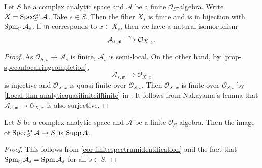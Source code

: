 \begin{corollary}\label{cor-finitespectrumidentification}
    Let $S$ be a complex analytic space and $\mathcal{A}$ be a finite $\mathcal{O}_S$-algebra. Write $X=\operatorname{Spec}^{\mathrm{an}}_S\mathcal{A}$.
    Take $s\in S$. Then the fiber $X_s$ is finite and is in bijection with $\operatorname{Spm}_{\mathbb{C}} \mathcal{A}_s$. If $\mathfrak{m}$ corresponds to $x\in X_s$, then we have a natural isomorphism 
    \[
        \mathcal{A}_{s,\mathfrak{m}}\stackrel{\sim}{\longrightarrow} \mathcal{O}_{X,x}.  
    \]
\end{corollary}
\begin{proof}
    As $\mathcal{O}_{S,s}\rightarrow \mathcal{A}_s$ is finite, $\mathcal{A}_s$ is semi-local. On the other hand, by \cref{prop-specanlocalringcompletion}, 
    \[
        \mathcal{A}_{s,\mathfrak{m}}\rightarrow   \mathcal{O}_{X,x}
    \]
    is injective and $\mathcal{O}_{X,x}$ is quasi-finite over $\mathcal{O}_{S,s}$. 
    Then $\mathcal{O}_{X,x}$ is finite over $\mathcal{O}_{S,s}$ by \cref{Local-thm-analyticquasifiniteifffinite} in .
    It follows from Nakayama's lemma that $\mathcal{A}_{s,\mathfrak{m}}\rightarrow   \mathcal{O}_{X,x}$ is also surjective.
\end{proof}

\begin{corollary}\label{cor-suppaffmorphism}
    Let $S$ be a complex analytic space and $\mathcal{A}$ be a finite $\mathcal{O}_S$-algebra. Then the image of $\operatorname{Spec}^{\mathrm{an}}_S\mathcal{A}\rightarrow S$ is $\operatorname{Supp} A$.
\end{corollary}
\begin{proof}
    This follows from \cref{cor-finitespectrumidentification} and the fact that $\operatorname{Spm}_{\mathbb{C}}\mathcal{A}_s=\operatorname{Spm}\mathcal{A}_s$ for all $s\in S$.
\end{proof}


